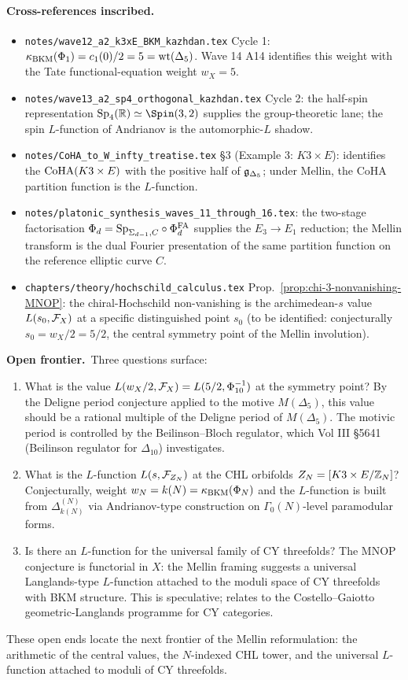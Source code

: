 \paragraph{Cross-references inscribed.}
\begin{itemize}[leftmargin=1.5em]
\item \texttt{notes/wave12\_a2\_k3xE\_BKM\_kazhdan.tex} Cycle 1:
  $\kappa_{\mathrm{BKM}}(\Phi_1)=c_1(0)/2=5=\mathrm{wt}(\Delta_5)$. Wave 14 A14
  identifies this weight with the Tate functional-equation weight
  $w_X=5$.
\item \texttt{notes/wave13\_a2\_sp4\_orthogonal\_kazhdan.tex} Cycle 2:
  the half-spin representation $\Sp_4(\R)\simeq\Spin(3,2)$
  supplies the group-theoretic lane; the spin $L$-function of
  Andrianov is the automorphic-$L$ shadow.
\item \texttt{notes/CoHA\_to\_W\_infty\_treatise.tex} \S3
  (Example 3: $K3\times E$): identifies the $\mathrm{CoHA}(K3\times E)$ with
  the positive half of $\mathfrak{g}_{\Delta_5}$; under Mellin, the
  CoHA partition function is the $L$-function.
\item \texttt{notes/platonic\_synthesis\_waves\_11\_through\_16.tex}:
  the two-stage factorisation $\Phi_d=\mathrm{Sp}_{\Sigma_{d-1},C}\circ\Phi^{\mathrm{FA}}_d$
  supplies the $E_3\to E_1$ reduction; the Mellin transform is the
  dual Fourier presentation of the same partition function on
  the reference elliptic curve $C$.
\item \texttt{chapters/theory/hochschild\_calculus.tex}
  Prop.~\ref{prop:chi-3-nonvanishing-MNOP}: the
  chiral-Hochschild non-vanishing is the archimedean-$s$ value
  $L(s_0,\mathcal{F}_X)$ at a specific distinguished point $s_0$ (to be
  identified: conjecturally $s_0=w_X/2=5/2$, the central symmetry
  point of the Mellin involution).
\end{itemize}

\medskip
\noindent\textbf{Open frontier.}\ Three questions surface:
\begin{enumerate}[label=(Q\arabic*),leftmargin=1.5em]
\item What is the value $L(w_X/2,\mathcal{F}_X)=L(5/2,\Phi_{10}^{-1})$ at
  the symmetry point? By the Deligne period conjecture applied to
  the motive $M(\Delta_5)$, this value should be a rational
  multiple of the Deligne period of $M(\Delta_5)$. The motivic
  period is controlled by the Beilinson--Bloch regulator, which
  Vol III \S5641 (Beilinson regulator for $\Delta_{10}$)
  investigates.
\item What is the $L$-function $L(s,\mathcal{F}_{Z_N})$ at the CHL
  orbifolds $Z_N=[K3\times E/\mathbb{Z}_N]$? Conjecturally, weight
  $w_N=k(N)=\kappa_{\mathrm{BKM}}(\Phi_N)$ and the $L$-function is built from
  $\Delta^{(N)}_{k(N)}$ via Andrianov-type construction on
  $\Gamma_0(N)$-level paramodular forms.
\item Is there an $L$-function for the universal family of CY
  threefolds? The MNOP conjecture is functorial in $X$: the
  Mellin framing suggests a universal Langlands-type $L$-function
  attached to the moduli space of CY threefolds with BKM
  structure. This is speculative; relates to the Costello--Gaiotto
  geometric-Langlands programme for CY categories.
\end{enumerate}

These open ends locate the next frontier of the Mellin
reformulation: the arithmetic of the central values, the
$N$-indexed CHL tower, and the universal $L$-function attached to
moduli of CY threefolds.
